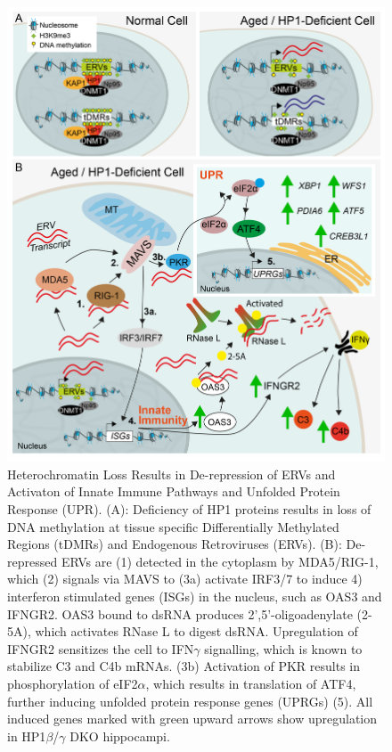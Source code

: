 \documentclass[onehalf,12pt]{beavtex}
\begin{document}
  \begin{figure}
  
  {\centering \includegraphics[width=1\linewidth, ]{./figure/discussion/final_model_black_arrows} 
  
  }
  
  \caption[Heterochromatin Loss Results in De-repression of ERVs and activaton of Innate Immune pathways and Unfolded Protein Response]{Heterochromatin Loss Results in De-repression of ERVs and Activaton of Innate Immune Pathways and Unfolded Protein Response (UPR). (A): Deficiency of HP1 proteins results in loss of DNA methylation at tissue specific Differentially Methylated Regions (tDMRs) and Endogenous Retroviruses (ERVs). (B): De-repressed ERVs are (1) detected in the cytoplasm by MDA5/RIG-1, which (2) signals via MAVS to (3a) activate IRF3/7 to induce 4) interferon stimulated genes (ISGs) in the nucleus, such as OAS3 and IFNGR2.  OAS3 bound to dsRNA produces 2',5'-oligoadenylate (2-5A), which activates RNase L to digest dsRNA.  Upregulation of IFNGR2 sensitizes the cell to IFN$\gamma$ signalling, which is known to stabilize C3 and C4b mRNAs. (3b) Activation of PKR results in phosphorylation of eIF2$\alpha$, which results in translation of ATF4, further inducing unfolded protein response genes (UPRGs) (5). All induced genes marked with green upward arrows show upregulation in HP1$\beta$/$\gamma$ DKO hippocampi.}\label{fig:finalmodel}
  \end{figure}
  
\end{document}
